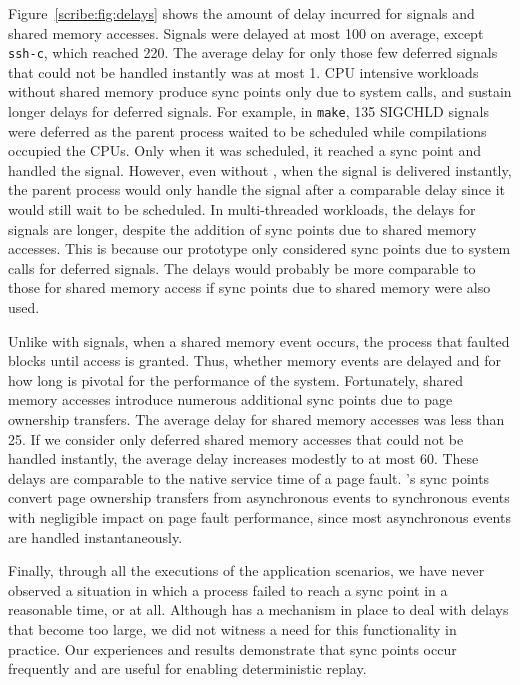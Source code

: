 Figure~\ref{scribe:fig:delays} shows the amount of delay incurred for signals
and shared memory accesses. Signals were delayed at most 100\us{}
on average, except {\tt ssh-c}, which reached 220\us{}. The average
delay for only those few deferred signals that could not be handled
instantly was at most 1\ms{}. CPU intensive workloads without shared
memory produce sync points only due to system calls, and sustain longer
delays for deferred signals.  For example, in {\tt make}, 135 SIGCHLD
signals were deferred as the parent process waited to be scheduled
while compilations occupied the CPUs. Only when it was scheduled, it
reached a sync point and handled the signal. However, even without
\scribe{}, when the signal is delivered instantly, the parent process
would only handle the signal after a comparable delay since it would
still wait to be scheduled.  In multi-threaded workloads, the
delays for signals are longer, despite the addition of sync points due
to shared memory accesses. This is because our prototype only
considered sync points due to system calls for deferred signals. The
delays would probably be more comparable to those for shared memory
access if sync points due to shared memory were also used.

Unlike with signals, when a shared memory event occurs, the process
that faulted blocks until access is granted. Thus, whether memory
events are delayed and for how long is pivotal for the performance of
the system. Fortunately, shared memory accesses introduce numerous
additional sync points due to page ownership transfers. The average
delay for shared memory accesses was less than 25\us{}. If we consider
only deferred shared memory accesses that could not be handled
instantly, the average delay increases modestly to at most 60\us{}.
These delays are comparable to the native service time of a page
fault. \scribe{}'s sync points convert page ownership transfers from
asynchronous events to synchronous events with negligible impact on
page fault performance, since most asynchronous events are handled
instantaneously.

Finally, through all the executions of the application scenarios,
we have never observed a situation in which a process failed to reach a sync
point in a reasonable time, or at all.  Although \scribe{} has a 
mechanism in place to deal with delays that become too large, we did
not witness a need for this functionality in practice.  
Our experiences and results demonstrate that sync points occur
frequently and are useful for enabling deterministic replay.


